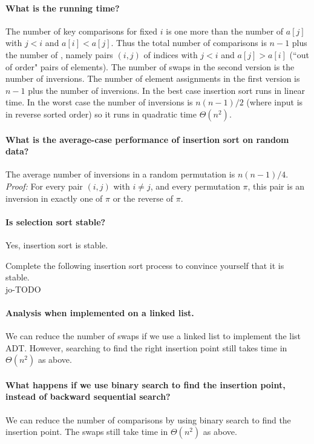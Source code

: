 \paragraph{What is the running time?}
The number of key comparisons for fixed $i$ is one more than the number of $a[j]$ with $j < i$ and $a[i] < a[j]$.
Thus the total number of comparisons is $n-1$ plus the number of , 
namely pairs $(i, j)$ of indices with $j < i$ and $a[j] > a[i]$ (``out of order" pairs of elements).
The number of swaps in the second version is the number of inversions. 
The number of element assignments in the first version is $n-1$ plus the number of inversions.
In the best case insertion sort runs in linear time. 
In the worst case the number of inversions is $n(n-1)/2$ 
(where input is in reverse sorted order) so it runs in quadratic time $\Theta(n^2)$.

\paragraph{What is the average-case performance of insertion sort on random data?}
The average number of inversions in a random permutation is $n(n-1)/4$.\\ 
\textit{Proof:} For every pair $(i,j)$ with $i\neq j$,  and every permutation $\pi$, 
this pair is an inversion in exactly one of $\pi$ or the reverse of $\pi$.


\paragraph{Is selection sort stable?}
Yes, insertion sort is stable.
\begin{Boxample}[0]
Complete the following insertion sort process to convince yourself that it is stable.\\
jo-TODO
\end{Boxample}

\paragraph{Analysis when implemented on a linked list.}
We can reduce the number of swaps if we use a linked list to implement 
the list ADT. However, searching to find the right insertion point still takes time in 
$\Theta(n^2)$ as above.

\paragraph{What happens if we use binary search to find the insertion point, instead of backward sequential search?}
We can reduce the number of comparisons by using binary search to find 
the insertion point. The swaps still take time in $\Theta(n^2)$ as above.


